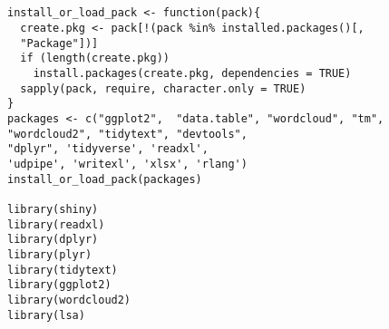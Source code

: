 \documentclass[bachelor, och, diploma ]{SCWorks}
\begin{document}
%
%
%


\begin{center}
    \section*{}
\end{center}
\begin{verbatim}
install_or_load_pack <- function(pack){
  create.pkg <- pack[!(pack %in% installed.packages()[, 
  "Package"])]
  if (length(create.pkg))
    install.packages(create.pkg, dependencies = TRUE)
  sapply(pack, require, character.only = TRUE)
}
packages <- c("ggplot2",  "data.table", "wordcloud", "tm", 
"wordcloud2", "tidytext", "devtools", 
"dplyr", 'tidyverse', 'readxl', 
'udpipe', 'writexl', 'xlsx', 'rlang')
install_or_load_pack(packages)

library(shiny)
library(readxl)
library(dplyr)
library(plyr)
library(tidytext)
library(ggplot2)
library(wordcloud2)
library(lsa)



\end{verbatim}
\end{document}
